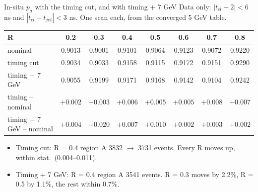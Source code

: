 \documentclass[aspectratio=169,10pt]{beamer}
\newcommand{\pa}{p_{a}}
\begin{document}
\begin{frame}{In-situ $\pa$ with the timing cut, and with timing + 7 GeV}
  \small
  Data only: $|t_{cl} + 2| < 6$ ns and $|t_{cl} - t_{jet}| < 3$ ns. One scan each, from the converged 5 GeV table.
  \vspace{0.5em}

  \centering
  \begin{tabular}{lccccccc}
    \toprule
    R & 0.2 & 0.3 & 0.4 & 0.5 & 0.6 & 0.7 & 0.8 \\
    \midrule
    nominal & 0.9013 & 0.9001 & 0.9101 & 0.9064 & 0.9123 & 0.9072 & 0.9220 \\
    timing cut & 0.9034 & 0.9033 & 0.9158 & 0.9115 & 0.9172 & 0.9151 & 0.9290 \\
    timing + 7 GeV & 0.9055 & 0.9199 & 0.9171 & 0.9168 & 0.9142 & 0.9104 & 0.9242 \\
    \midrule
    timing -- nominal & $+0.002$ & $+0.003$ & $+0.006$ & $+0.005$ & $+0.005$ & $+0.008$ & $+0.007$ \\
    timing + 7 GeV -- nominal & $+0.004$ & $+0.020$ & $+0.007$ & $+0.010$ & $+0.002$ & $+0.003$ & $+0.002$ \\
    \bottomrule
  \end{tabular}
  \vspace{0.6em}
  \raggedright
  \begin{itemize}
    \item Timing cut: R = 0.4 region A 3832 $\to$ 3731 events. Every R moves up, within stat.\ (0.004--0.011).
    \item Timing + 7 GeV: R = 0.4 region A 3541 events. R = 0.3 moves by 2.2\%, R = 0.5 by 1.1\%, the rest within 0.7\%.
  \end{itemize}
\end{frame}
\end{document}
